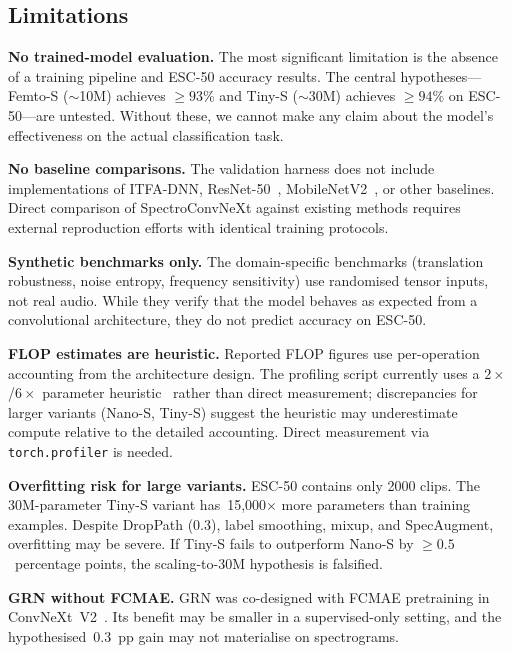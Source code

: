 \documentclass{article}
\begin{document}
\subsection{Limitations}
\label{sec:limitations}

\textbf{No trained-model evaluation.} The most significant limitation is the
absence of a training pipeline and ESC-50 accuracy results. The central
hypotheses---Femto-S ($\sim$10M) achieves $\geq 93\%$ and Tiny-S ($\sim$30M)
achieves $\geq 94\%$ on ESC-50---are untested. Without these, we cannot make
any claim about the model's effectiveness on the actual classification task.

\textbf{No baseline comparisons.} The validation harness does not include
implementations of ITFA-DNN, ResNet-50~\cite{he2016resnet}, MobileNetV2~\cite{sandler2018mobilenetv2}, or other baselines.
Direct comparison of SpectroConvNeXt against existing methods requires
external reproduction efforts with identical training protocols.

\textbf{Synthetic benchmarks only.} The domain-specific benchmarks
(translation robustness, noise entropy, frequency sensitivity) use randomised
tensor inputs, not real audio. While they verify that the model behaves as
expected from a convolutional architecture, they do not predict accuracy on
ESC-50.

\textbf{FLOP estimates are heuristic.} Reported FLOP figures use per-operation
accounting from the architecture design. The profiling script currently uses a
$2\times$/$6\times$ parameter heuristic~\cite{kaplan2020scaling} rather than
direct measurement; discrepancies for larger variants (Nano-S, Tiny-S) suggest
the heuristic may underestimate compute relative to the detailed accounting.
Direct measurement via \texttt{torch.profiler} is needed.

\textbf{Overfitting risk for large variants.} ESC-50 contains only 2000 clips.
The 30M-parameter Tiny-S variant has~15,000$\times$ more parameters than
training examples. Despite DropPath (0.3), label smoothing, mixup, and
SpecAugment, overfitting may be severe. If Tiny-S fails to outperform Nano-S by
$\geq 0.5$~percentage points, the scaling-to-30M hypothesis is falsified.

\textbf{GRN without FCMAE.} GRN was co-designed with FCMAE pretraining in
ConvNeXt~V2~\cite{woo2023convnextv2}. Its benefit may be smaller in a
supervised-only setting, and the hypothesised~0.3~pp gain may not materialise
on spectrograms.

\end{document}
